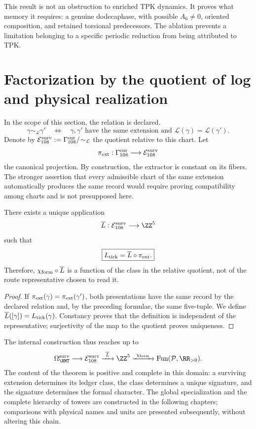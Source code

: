 This result is not an obstruction to enriched TPK dynamics. It proves
what memory it requires: a genuine dodecaphase, with possible
\(A_6\ne0\), oriented composition, and retained torsional predecessors. The
ablation prevents a limitation belonging to a specific periodic reduction
from being attributed to TPK.

\section{Factorization by the quotient of log and physical realization}

In the scope of this section, the relation is declared.
\[
\gamma\sim_{\mathcal L}\gamma'
\quad\Longleftrightarrow\quad
\text{\(\gamma,\gamma'\) have the same extension and }
\mathcal L(\gamma)=\mathcal L(\gamma').
\]
Denote by
\(\mathcal E_{108}^{\rm surv}:=
\Gamma_{108}^{\rm enr}/\!\sim_{\mathcal L}\)
the quotient relative to this chart. Let
\[
 \pi_{\rm ext}:\Gamma_{108}^{\rm enr}\longrightarrow
 \mathcal E_{108}^{\rm surv}
\]
the canonical projection. By construction, the extractor is constant on its
fibers. The stronger assertion that every admissible chart of the same
extension automatically produces the same record would require proving
compatibility among charts and is not presupposed here.

\begin{theorem}
\label{thm:descenso-caracter-extension}
There exists a unique application
\[
 \overline L:\mathcal E_{108}^{\rm surv}\longrightarrow\ZZ^5
\]
such that
\[
 \boxed{L_{\rm tick}=\overline L\circ\pi_{\rm ext}.}
\]
Therefore, \(\chi_{\rm form}\circ\overline L\) is a function of the class in
the relative quotient, not of the route representative chosen to read it.
\end{theorem}

\begin{proof}
If \(\pi_{\rm ext}(\gamma)=\pi_{\rm ext}(\gamma')\), both presentations
have the same record by the declared relation and, by the preceding
formulae, the same five-tuple. We define
\(\overline L([\gamma])=L_{\rm tick}(\gamma)\). Constancy proves that the
definition is independent of the representative; surjectivity of the map
to the quotient proves uniqueness.
\end{proof}

The internal construction thus reaches up to
\[
 \Omega_{\HMT}^{\rm surv}
 \longrightarrow\mathcal E_{108}^{\rm surv}
 \xrightarrow{\ \overline L\ }\ZZ^5
 \xrightarrow{\ \chi_{\rm form}\ }
 \operatorname{Fun}(\mathcal P,\RR_{>0}).
\]
The content of the theorem is positive and complete in this domain: a
surviving extension determines its ledger class, the class determines a
unique signature, and the signature determines the formal character. The global
specialization and the complete hierarchy of towers are constructed in the following
chapters; comparisons with physical names and units are presented
subsequently, without altering this chain.
